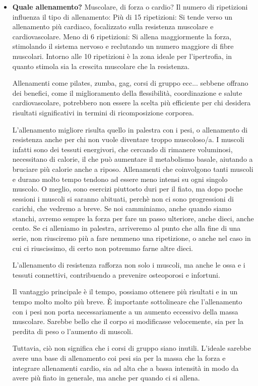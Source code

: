 \documentclass[12pt]{book} %
\begin{document}
\begin{itemize}
\item \textbf{Quale allenamento?}
Muscolare, di forza o cardio?
Il numero di ripetizioni influenza il tipo di allenamento:
Più di 15 ripetizioni: Si tende verso un allenamento più cardiaco, focalizzato sulla resistenza muscolare e cardiovascolare.
Meno di 6 ripetizioni: Si allena maggiormente la forza, stimolando il sistema nervoso e reclutando un numero maggiore di fibre muscolari.
Intorno alle 10 ripetizioni è la zona ideale per l'ipertrofia, in quanto stimola sia la crescita muscolare che la resistenza.

Allenamenti come pilates, zumba, gag,  corsi di gruppo ecc... sebbene offrano dei benefici, come il miglioramento della flessibilità, coordinazione e salute cardiovascolare, potrebbero non essere la scelta più efficiente per chi desidera risultati significativi in termini di ricomposizione corporea.

L'allenamento migliore risulta quello in palestra con i pesi, o allenamento di resistenza anche per chi non vuole diventare troppo muscoloso/a.
I muscoli infatti sono dei tessuti energivori, che cercando di rimanere voluminosi, necessitano di calorie, il che può aumentare il metabolismo basale, aiutando a bruciare più calorie anche a riposo.
Allenamenti che coinvolgono tanti muscoli e durano molto tempo tendono ad essere meno intensi su ogni singolo muscolo. O meglio, sono esercizi piuttosto duri per il fiato, ma dopo poche sessioni i muscoli si saranno abituati, perchè non ci sono progressioni di carichi, che vedremo a breve. Se noi camminiamo, anche quando siamo stanchi, avremo sempre la forza per fare un passo ulteriore, anche dieci, anche cento. Se ci alleniamo in palestra, arriveremo al punto che alla fine di una serie, non riusciremo più a fare nemmeno una ripetizione, o anche nel caso in cui ci riuscissimo, di certo non potremmo farne altre dieci.

L'allenamento di resistenza rafforza non solo i muscoli, ma anche le ossa e i tessuti connettivi, contribuendo a prevenire osteoporosi e infortuni. 

Il vantaggio principale è il tempo, possiamo ottenere più risultati e in un tempo molto molto più breve. È importante sottolineare che l'allenamento con i pesi non porta necessariamente a un aumento eccessivo della massa muscolare. Sarebbe bello che il corpo si modificasse velocemente, sia per la perdita di peso o l'aumento di muscoli.

Tuttavia, ciò non significa che i corsi di gruppo siano inutili. L'ideale sarebbe avere una base di allenamento coi pesi sia per la massa che la forza e integrare allenamenti cardio, sia ad alta che a bassa intensità in modo da avere più fiato in generale, ma anche per quando ci si allena.


\end{itemize}
\end{document}
